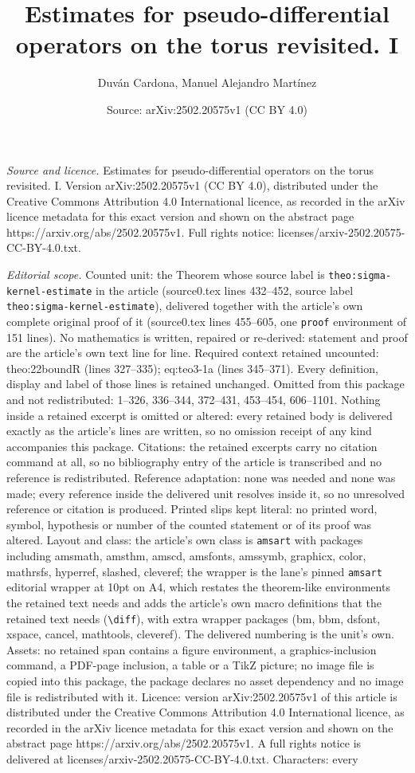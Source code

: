 \documentclass[10pt,a4paper]{amsart}
\title[Estimates for pseudo-differential operators on the torus rev]{Estimates for pseudo-differential operators on the torus revisited. I}
\author{Duv\'an Cardona, Manuel Alejandro Mart\'inez}
\date{Source: arXiv:2502.20575v1 (CC BY 4.0)}
\begin{document}
\maketitle

\noindent\emph{Source and licence.} Estimates for pseudo-differential operators on the torus revisited. I. Version arXiv:2502.20575v1 (CC BY 4.0), distributed under the Creative Commons Attribution 4.0 International licence, as recorded in the arXiv licence metadata for this exact version and shown on the abstract page https://arxiv.org/abs/2502.20575v1. Full rights notice: licenses/arxiv-2502.20575-CC-BY-4.0.txt.\par\smallskip

\noindent\textit{Editorial scope.} Counted unit: the Theorem whose source label is \texttt{theo:sigma-kernel-estimate} in the article (source0.tex lines 432--452, source label \texttt{theo:sigma-kernel-estimate}), delivered together with the article's own complete original proof of it (source0.tex lines 455--605, one \texttt{proof} environment of 151 lines). No mathematics is written, repaired or re-derived: statement and proof are the article's own text line for line. Required context retained uncounted: theo:22boundR (lines 327--335); eq:teo3-1a (lines 345--371). Every definition, display and label of those lines is retained unchanged. Omitted from this package and not redistributed: 1--326, 336--344, 372--431, 453--454, 606--1101. Nothing inside a retained excerpt is omitted or altered: every retained body is delivered exactly as the article's lines are written, so no omission receipt of any kind accompanies this package. Citations: the retained excerpts carry no citation command at all, so no bibliography entry of the article is transcribed and no reference is redistributed. Reference adaptation: none was needed and none was made; every reference inside the delivered unit resolves inside it, so no unresolved reference or citation is produced. Printed slips kept literal: no printed word, symbol, hypothesis or number of the counted statement or of its proof was altered. Layout and class: the article's own class is \texttt{amsart} with packages including amsmath, amsthm, amscd, amsfonts, amssymb, graphicx, color, mathrsfs, hyperref, slashed, cleveref; the wrapper is the lane's pinned \texttt{amsart} editorial wrapper at 10pt on A4, which restates the theorem-like environments the retained text needs and adds the article's own macro definitions that the retained text needs (\texttt{\textbackslash diff}), with extra wrapper packages (bm, bbm, dsfont, xspace, cancel, mathtools, cleveref). The delivered numbering is the unit's own. Assets: no retained span contains a figure environment, a graphics-inclusion command, a PDF-page inclusion, a table or a TikZ picture; no image file is copied into this package, the package declares no asset dependency and no image file is redistributed with it. Licence: version arXiv:2502.20575v1 of this article is distributed under the Creative Commons Attribution 4.0 International licence, as recorded in the arXiv licence metadata for this exact version and shown on the abstract page https://arxiv.org/abs/2502.20575v1. A full rights notice is delivered at licenses/arxiv-2502.20575-CC-BY-4.0.txt. Characters: every 
\end{document}
